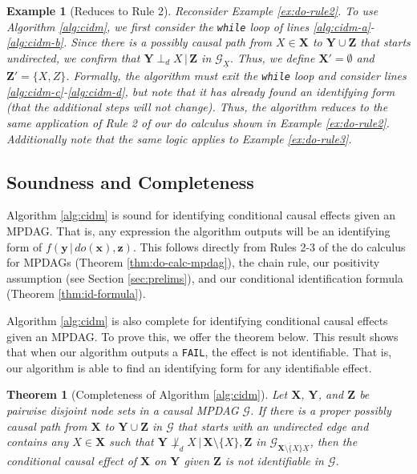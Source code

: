 \documentclass[11pt]{article}
\newtheorem{example}{Example}
\newtheorem{theorem}{Theorem}
\newcommand{\mb}[1]{\mathbf{#1}}
\newcommand{\dsepp}{\perp_{d}}
\newcommand{\g}[1][G]{\mathcal{#1}}
\begin{document}
\begin{example}[Reduces to Rule 2]
    Reconsider Example \ref{ex:do-rule2}. To use Algorithm \ref{alg:cidm}, we first consider the \emph{\texttt{while}} loop of lines \ref{alg:cidm-a}-\ref{alg:cidm-b}. Since there is a possibly causal path from $X \in \mb{X}$ to $\mb{Y} \cup \mb{Z}$ that starts undirected, we confirm that $\mb{Y} \dsepp X \,|\, \mb{Z}$ in $\g_{\underline{X}}$. Thus, we define $\mb{X'} = \emptyset$ and $\mb{Z'} = \{X,Z\}$. Formally, the algorithm must exit the \emph{\texttt{while}} loop and consider lines \ref{alg:cidm-c}-\ref{alg:cidm-d}, but note that it has already found an identifying form (that the additional steps will not change). Thus, the algorithm reduces to the same application of Rule 2 of our do calculus shown in Example \ref{ex:do-rule2}. Additionally note that the same logic applies to Example \ref{ex:do-rule3}.
\end{example}






\subsection{Soundness and Completeness}
\label{sec:alg-condition}

Algorithm \ref{alg:cidm} is sound for identifying conditional causal effects given an MPDAG. That is, any expression the algorithm outputs will be an identifying form of $f(\mb{y} \,|\, do(\mb{x}), \mb{z})$. This follows directly from Rules 2-3 of the do calculus for MPDAGs (Theorem \ref{thm:do-calc-mpdag}), the chain rule, our positivity assumption (see Section \ref{sec:prelims}), and our conditional identification formula (Theorem \ref{thm:id-formula}).

Algorithm \ref{alg:cidm} is also complete for identifying conditional causal effects given an MPDAG. To prove this, we offer the theorem below. This result shows that when our algorithm outputs a \texttt{FAIL}, the effect is not identifiable. That is, our algorithm is able to find an identifying form for any identifiable effect.


\begin{theorem}[Completeness of Algorithm \ref{alg:cidm}]
\label{thm:alg-complete}    
    Let $\mb{X}$, $\mb{Y}$, and $\mb{Z}$ be pairwise disjoint node sets in a causal MPDAG $\g$. If there is a proper possibly causal path from $\mb{X}$ to $\mb{Y} \cup \mb{Z}$ in $\g$ that starts with an undirected edge and contains any $X \in \mb{X}$ such that $\mb{Y} \not\dsepp X \,|\, \mb{X} \setminus \{X\}, \mb{Z}$ in $\g_{\overline{\mb{X} \setminus \{X\}} \underline{X}}$, then the conditional causal effect of $\mb{X}$ on $\mb{Y}$ given $\mb{Z}$ is not identifiable in $\g$.
\end{theorem}
\end{document}
